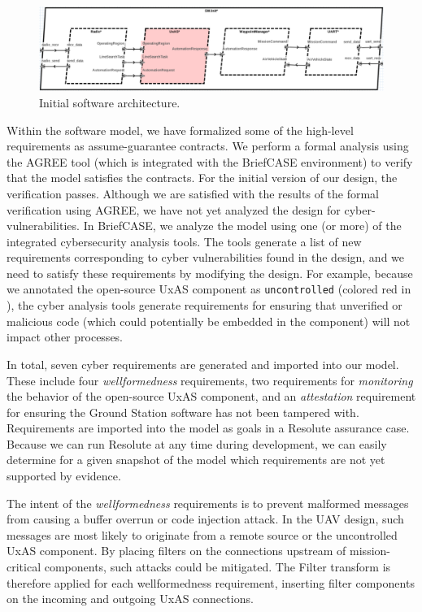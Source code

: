 \begin{figure}[h]
	\centering
	\includegraphics[width=1\columnwidth]{figs/sw-initial.png}
	\caption{Initial software architecture.} 
	\label{fig:sw-initial} 
\end{figure}

Within the software model, we have formalized some of the high-level requirements as assume-guarantee contracts.  We perform a formal analysis using the AGREE tool (which is integrated with the BriefCASE environment) to verify that the model satisfies the contracts.  For the initial version of our design, the verification passes.
%
Although we are satisfied with the results of the formal verification using AGREE, we have not yet analyzed the design for cyber-vulnerabilities.  
In BriefCASE, we analyze the model using one (or more) of the integrated cybersecurity analysis tools.  The tools generate a list of new requirements corresponding to cyber vulnerabilities found in the design,
and we need to satisfy these requirements by modifying the design.
%
For example, because we annotated the open-source UxAS component as \texttt{uncontrolled} (colored red in ), the cyber analysis tools generate requirements for ensuring that unverified or malicious code (which could potentially be embedded in the component) will not impact other processes. 

In total, seven cyber requirements are generated and imported into our model.  These include four \textit{wellformedness} requirements, two requirements for \textit{monitoring} the behavior of the open-source UxAS component, and an \textit{attestation} requirement for ensuring the Ground Station software has not been tampered with.  Requirements are imported into the model as goals in a Resolute assurance case.  Because we can run Resolute at any time during development, we can easily determine for a given snapshot of the model which requirements are not yet supported by evidence.

The intent of the \textit{wellformedness} requirements is to prevent malformed messages from causing a buffer overrun or code injection attack.  In the UAV design, such messages are most likely to originate from a remote source or the uncontrolled UxAS component.  By placing filters on the connections upstream of mission-critical components, such attacks could be mitigated.  The Filter transform is therefore applied for each wellformedness requirement, inserting filter components on the incoming and outgoing UxAS connections.  

